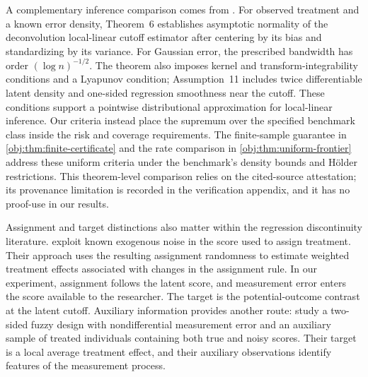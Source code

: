 A complementary inference comparison comes from \citet[Chapter~2, Assumptions~8, 9, 11, and 13; Theorem~6; printed pp.~49, 59, and 61]{Dong2018Thesis}. For observed treatment and a known error density, Theorem~6 establishes asymptotic normality of the deconvolution local-linear cutoff estimator after centering by its bias and standardizing by its variance. For Gaussian error, the prescribed bandwidth has order \((\log n)^{-1/2}\). The theorem also imposes kernel and transform-integrability conditions and a Lyapunov condition; Assumption~11 includes twice differentiable latent density and one-sided regression smoothness near the cutoff. These conditions support a pointwise distributional approximation for local-linear inference. Our criteria instead place the supremum over the specified benchmark class inside the risk and coverage requirements. The finite-sample guarantee in \cref{obj:thm:finite-certificate} and the rate comparison in \cref{obj:thm:uniform-frontier} address these uniform criteria under the benchmark's density bounds and Hölder restrictions. This theorem-level comparison relies on the cited-source attestation; its provenance limitation is recorded in the verification appendix, and it has no proof-use in our results.

Assignment and target distinctions also matter within the regression discontinuity literature. \citet{Eckles2025} exploit known exogenous noise in the score used to assign treatment. Their approach uses the resulting assignment randomness to estimate weighted treatment effects associated with changes in the assignment rule. In our experiment, assignment follows the latent score, and measurement error enters the score available to the researcher. The target is the potential-outcome contrast at the latent cutoff. Auxiliary information provides another route: \citet{DaveziesLeBarbanchon2017ContinuousError} study a two-sided fuzzy design with nondifferential measurement error and an auxiliary sample of treated individuals containing both true and noisy scores. Their target is a local average treatment effect, and their auxiliary observations identify features of the measurement process.

